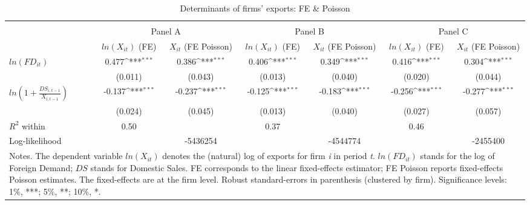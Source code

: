 \documentclass[a4paper,12pt]{article}
\begin{document}

\begin{table}[ht]
\caption{Determinants of firms' exports: FE \& Poisson}
\label{tb:regression}
\centering
\resizebox{1.0\textwidth}{!}
{\def\sym#1{\ifmmode^{#1}\else\(^{#1}\)\fi}
\begin{tabular}{lcc|cc|cc}
\hline\hline
\\[-1em]
 & \multicolumn{2}{c}{\small Panel A} & \multicolumn{2}{c}{\small Panel B} & \multicolumn{2}{c}{\small Panel C}\\[0.1cm] \hline
 &\multicolumn{1}{c}{$ ln(X_{it}) $ (FE)}&\multicolumn{1}{c|}{$ X_{it} $ (FE Poisson)}&\multicolumn{1}{c}{$ ln(X_{it}) $ (FE)}&\multicolumn{1}{c|}{$ X_{it} $ (FE Poisson)}&\multicolumn{1}{c}{$ ln(X_{it}) $ (FE)}&\multicolumn{1}{c}{$ X_{it} $ (FE Poisson)}\\[0.1cm]
\hline
 $ ln(FD_{it}) $&       0.477\sym{***}&       0.386\sym{***}&       0.406\sym{***}&       0.349\sym{***}&       0.416\sym{***}&       0.304\sym{***}\\[0.1cm]
            &     (0.011)         &     (0.043)         &     (0.013)         &     (0.040)         &     (0.020)         &     (0.044)         \\
 $ ln\left ( 1+\frac{DS_{i,t-1}}{X_{i,t-1}} \right )$&      -0.137\sym{***}&      -0.237\sym{***}&      -0.125\sym{***}&      -0.183\sym{***}&      -0.256\sym{***}&      -0.277\sym{***}\\
          &     (0.024)         &     (0.045)         &     (0.013)         &     (0.040)         &     (0.027)         &     (0.057)         \\
\hline
$ R^{2} $ within  &        0.50         &                     &        0.37         &                     &        0.46         &                     \\
Log-likelihood&            & -5436254         &            & -4544774         &             & -2455400         \\[0.1cm] \hline\hline
\multicolumn{7}{p{22.1cm}}{Notes.
The dependent variable $ln\left (X_{it} \right )$ denotes the (natural) log of exports for firm \textit{i} in period \textit{t}. $ln(FD_{it})$ stands for the log of Foreign Demand; $DS$ stands for Domestic Sales. FE corresponds to the linear fixed-effects estimator; FE Poisson reports fixed-effects Poisson estimates. The fixed-effects are at the firm level.
Robust standard-errors in parenthesis (clustered by firm). Significance levels: 1\%, ***; 5\%, **; 10\%, *.
}
\end{tabular}}
\end{table}
\end{document}
